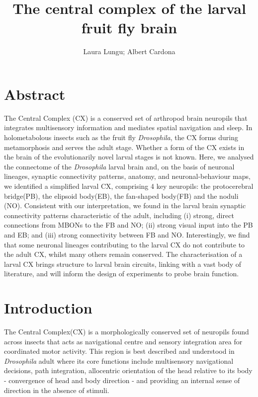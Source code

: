 \documentclass{article}
\title{The central complex of the larval fruit fly brain}
\author{Laura Lungu;  Albert Cardona}
\date{}
\begin{document}
\maketitle


\section*{Abstract}
     The Central Complex (CX) is a conserved set of arthropod brain neuropils that integrates multisensory information and mediates spatial navigation and sleep. In holometabolous insects such as the fruit fly \textit{Drosophila}, the CX forms during metamorphosis and serves the adult stage. Whether a form of the CX exists in the brain of the evolutionarily novel larval stages is not known. Here, we analysed the connectome of the \textit{Drosophila} larval brain and, on the basis of neuronal lineages, synaptic connectivity patterns, anatomy, and neuronal-behaviour maps, we identified a simplified larval CX, comprising 4 key neuropils: the protocerebral bridge(PB), the elipsoid body(EB), the fan-shaped body(FB) and the noduli (NO). Consistent with our interpretation, we found in the larval brain synaptic connectivity patterns characteristic of the adult, including (i) strong, direct connections from MBONs to the FB and NO; (ii) strong visual input into the PB and EB; and (iii) strong connectivity between FB and NO. Interestingly, we find that some neuronal lineages contributing to the larval CX do not contribute to the adult CX, whilst many others remain conserved. The characterisation of a larval CX brings structure to larval brain circuits, linking with a vast body of literature, and will inform the design of experiments to probe brain function.
    
    
\section{Introduction}

The Central Complex(CX) is a morphologically conserved set of neuropils found across insects
that acts as navigational centre and sensory integration area for coordinated motor activity.
This region is best described %
and understood %
in \textit{Drosophila} adult where its core functions include multisensory navigational decisions, path integration, allocentric orientation of the head relative to its body - convergence of head and body direction - and providing an internal sense of direction in the absence of stimuli. %
\end{document}
